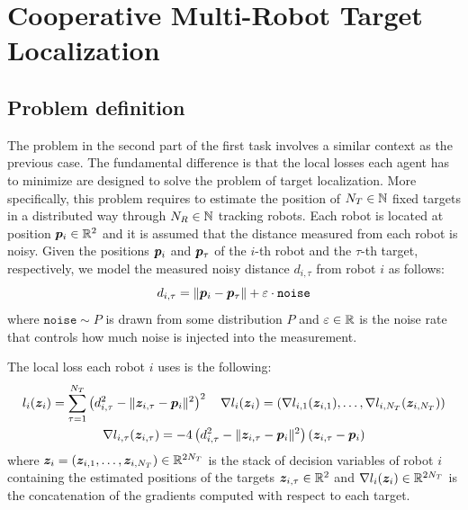 \documentclass[a4paper,11pt,oneside]{book}
\begin{document}
\chapter{Cooperative Multi-Robot Target Localization} \label{ch:localization}


\section{Problem definition}

The problem in the second part of the first task involves a similar context as the previous case. The fundamental difference is that the local losses each agent has to minimize are designed to solve the problem of target localization. More specifically, this problem requires to estimate the position of $N_T \in {\mathbb{N}}$ fixed targets in a distributed way through $N_R \in {\mathbb{N}}$ tracking robots. Each robot is located at position ${\bm{p}}_i \in {\mathbb{R}}^2$ and it is assumed that the distance measured from each robot is noisy. Given the positions ${\bm{p}}_i$ and ${\bm{p}}_\tau$ of the $i$-th robot and the $\tau$-th target, respectively, we model the measured noisy distance $d_{i,\tau}$ from robot $i$ as follows:
\[
      d_{i,\tau} = \Vert {\bm{p}}_i - {\bm{p}}_\tau \Vert + \varepsilon \cdot \texttt{noise}
\]
where $\texttt{noise} \sim P$ is drawn from some distribution $P$ and $\varepsilon \in {\mathbb{R}}$ is the noise rate that controls how much noise is injected into the measurement.

The local loss each robot $i$ uses is the following:
\[
      \begin{gathered}
            l_i({\bm{z}}_i) = \sum_{\tau=1}^{N_T} \left( d_{i,\tau}^2 - \Vert {\bm{z}}_{i,\tau} - {\bm{p}}_i \Vert^2 \right)^2
            \quad
            \nabla l_{i}({\bm{z}}_i) = (\nabla l_{i,1}({\bm{z}}_{i,1}), \dots, \nabla l_{i,N_T}({\bm{z}}_{i,N_T}))
            \\
            \nabla l_{i,\tau}({\bm{z}}_{i,\tau}) = -4 \left( d_{i,\tau}^2 - \Vert {\bm{z}}_{i,\tau} - {\bm{p}}_i \Vert^2 \right) \left( {\bm{z}}_{i,\tau} - {\bm{p}}_i \right)
      \end{gathered}
\]
where ${\bm{z}}_i = ({\bm{z}}_{i,1}, \dots, {\bm{z}}_{i,N_T}) \in {\mathbb{R}}^{2N_T}$ is the stack of decision variables of robot $i$ containing the estimated positions of the targets ${\bm{z}}_{i,\tau} \in {\mathbb{R}}^2$ and $\nabla l_i({\bm{z}}_i) \in {\mathbb{R}}^{2N_T}$ is the concatenation of the gradients computed with respect to each target.
\end{document}
